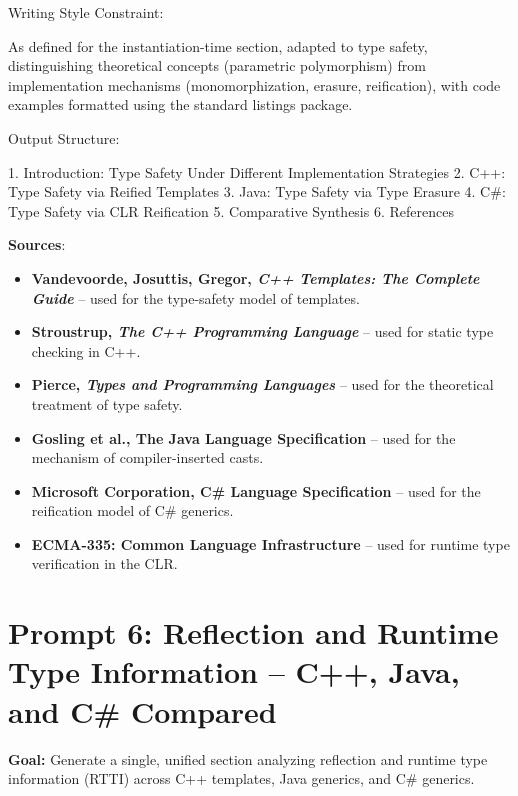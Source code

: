 \documentclass[11pt]{report}
\begin{document}
\begin{PromptVerbatim}
Writing Style Constraint:

As defined for the instantiation-time section, adapted to type safety,
distinguishing theoretical concepts (parametric polymorphism) from
implementation mechanisms (monomorphization, erasure, reification), with
code examples formatted using the standard listings package.

Output Structure:

1. Introduction: Type Safety Under Different Implementation Strategies
2. C++: Type Safety via Reified Templates
3. Java: Type Safety via Type Erasure
4. C#: Type Safety via CLR Reification
5. Comparative Synthesis
6. References
\end{PromptVerbatim}

\vspace{0.5em}
\noindent\textbf{Sources}:
\begin{itemize}
    \item \textbf{Vandevoorde, Josuttis, Gregor, \emph{C++ Templates: The Complete Guide}} \cite{cpp_templates2017} -- used for the type-safety model of templates.
    \item \textbf{Stroustrup, \emph{The C++ Programming Language}} \cite{stroustrup2013} -- used for static type checking in C++.
    \item \textbf{Pierce, \emph{Types and Programming Languages}} \cite{pierce2002} -- used for the theoretical treatment of type safety.
    \item \textbf{Gosling et al., The Java Language Specification} \cite{gosling2014java} -- used for the mechanism of compiler-inserted casts.
    \item \textbf{Microsoft Corporation, C\# Language Specification} \cite{CSharpSpec} -- used for the reification model of C\# generics.
    \item \textbf{ECMA-335: Common Language Infrastructure} \cite{ecma335_2024} -- used for runtime type verification in the CLR.
\end{itemize}

\section{Prompt 6: Reflection and Runtime Type Information -- C++, Java, and C\# Compared}
\label{Prompt 6 Reflection}

\noindent\textbf{Goal:} Generate a single, unified section analyzing reflection and runtime type information (RTTI) across C++ templates, Java generics, and C\# generics.
\end{document}
